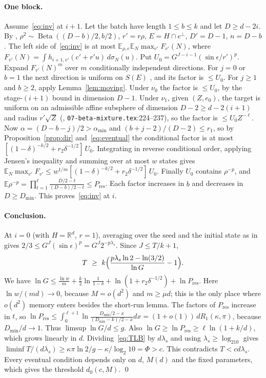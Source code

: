 \documentclass[11pt]{article}
\theoremstyle{definition}
\theoremstyle{remark}
\newcommand{\R}{\mathbb R}
\newcommand{\E}{\mathbb E}
\DeclareMathOperator{\Beta}{Beta}
\newcommand{\Ores}{P_{\mathrm{res}}}
\begin{document}
\paragraph{One block.} Assume~\eqref{eq:inv} at \(i+1\). Let the batch have length \(1\le b\le k\) and let \(D\ge d-2i\).
By \cite[Lemmas~2.4 and~2.5]{OAIsub}, \(\rho^2\sim\Beta((D-b)/2,b/2)\), \(r'=r\rho\), \(E=H\cap e^\perp\), \(D'=D-1\),
\(n=D-b\). The left side of~\eqref{eq:inv} is at most \(\E_{\rho,e}\E_N\max_{v'}F_{v'}(N)\), where
\(F_{v'}(N)=\int h_{i+1,v'}(c'+r'u)\,d\sigma_N(u)\). Put \(U_0=G^{J-i-1}(\sin\epsilon/r')^p\). Expand
\(F_{v'}(N)^m\) over \(m\) conditionally independent directions. For \(j=0\) or \(b=1\) the next direction is
uniform on \(S(E)\) \cite[Lemma~3.2]{OAIsub}, and its factor is \(\le U_0\). For \(j\ge1\) and \(b\ge2\), apply
Lemma~\ref{lem:moving}. Under \(\nu_0\) the factor is \(\le U_0\), by the stage-\((i+1)\) bound in dimension
\(D-1\). Under \(\nu_1\), given \((Z,e_0)\), the target is uniform on an admissible affine subsphere of dimension
\(D-2\ge d-2(i+1)\) and radius \(r'\sqrt Z\) (\cite{OAIsub}, \texttt{07-beta-mixture.tex}:224--237), so the
factor is \(\le U_0Z^{-\ell}\). Now \(\alpha=(D-b-j)/2>\alpha_{\min}\) and \((b+j-2)/(D-2)\le r_1\), so by
Proposition~\ref{prop:dir} and~\eqref{eq:eventual} the conditional factor is at most
\([(1-\delta)^{-k/2}+r_2\delta^{-1/2}]\,U_0\). Integrating in reverse conditional order, applying Jensen's
inequality and summing over at most \(w\) states \cite[Lemma~2.5]{OAIsub} gives
\(\E_N\max_{v'}F_{v'}\le w^{1/m}[(1-\delta)^{-k/2}+r_2\delta^{-1/2}]\,U_0\).
Finally \(U_0\) contains \(\rho^{-p}\), and
\(\E\rho^{-p}=\prod_{t=1}^\ell\frac{D/2-t}{(D-b)/2-t}\le\Ores\). Each factor increases in \(b\) and decreases in
\(D\ge D_{\min}\). This proves~\eqref{eq:inv} at \(i\).

\paragraph{Conclusion.} At \(i=0\) (with \(H=\R^d\), \(r=1\)), averaging over the seed and the initial state as in \cite{OAIsub}
gives \(2/3\le G^J(\sin\epsilon)^p=G^J2^{-p\lambda_s}\). Since \(J\le T/k+1\),
\begin{equation}\label{eq:TLB}
 T\ \ge\ k\Bigl(\frac{p\lambda_s\ln2-\ln(3/2)}{\ln G}-1\Bigr).
\end{equation}
We have \(\ln G\le\frac{\ln w}{m}+\frac k2\ln\frac1{1-\delta}+\ln(1+r_2\delta^{-1/2})+\ln\Ores\). Here
\(\ln w/(md)\to0\), because \(M=o(d^2)\) and \(m\ge\mu d\); this is the only place where \(o(d^2)\) memory enters
besides the short-run lemma. The factors of \(\Ores\) increase in \(t\), so
\(\ln\Ores\le\int_0^{\ell+1}\ln\frac{D_{\min}/2-x}{(D_{\min}-k)/2-x}dx=(1+o(1))\,dR_1(\kappa,\pi)\), because \(D_{\min}/d\to1\). Thus
\(\limsup\ln G/d\le g\). Also \(\ln G\ge\ln\Ores\ge\ell\ln(1+k/d)\), which grows linearly in \(d\). Dividing~\eqref{eq:TLB}
by \(d\lambda_s\) and using \(\lambda_s\ge\log_210\) gives
\(\liminf T/(d\lambda_s)\ge\kappa\pi\ln2/g-\kappa/\log_2 10=\Phi>c\). This contradicts \(T<cd\lambda_s\).
Every eventual condition depends only on \(d\), \(M(d)\) and the fixed parameters, which gives the
threshold \(d_0(c,M)\). \qed
\end{document}
